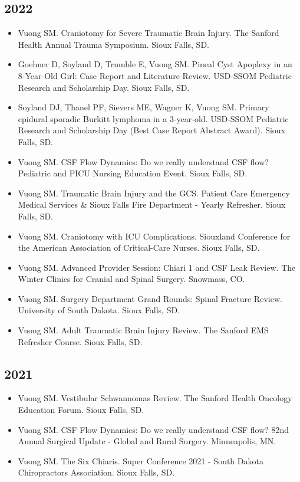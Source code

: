 \documentclass[11pt, a4paper]{article}
\begin{document}
\subsection{2022}
\begin{itemize}
  \setlength\itemindent{0.25em}
  \item Vuong SM. Craniotomy for Severe Traumatic Brain Injury. The Sanford Health Annual Trauma Symposium. Sioux Falls, SD.
  \item Goehner D, Soyland D, Trumble E, Vuong SM. Pineal Cyst Apoplexy in an 8-Year-Old Girl: Case Report and Literature Review. USD-SSOM Pediatric Research and Scholarship Day. Sioux Falls, SD.
  \item Soyland DJ, Thanel PF, Sievers ME, Wagner K, Vuong SM. Primary epidural sporadic Burkitt lymphoma in a 3-year-old. USD-SSOM Pediatric Research and Scholarship Day (Best Case Report Abstract Award). Sioux Falls, SD.
  \item Vuong SM. CSF Flow Dynamics: Do we really understand CSF flow? Pediatric and PICU Nursing Education Event. Sioux Falls, SD.
  \item Vuong SM. Traumatic Brain Injury and the GCS. Patient Care Emergency Medical Services \& Sioux Falls Fire Department - Yearly Refresher. Sioux Falls, SD.
  \item Vuong SM. Craniotomy with ICU Complications. Siouxland Conference for the American Association of Critical-Care Nurses. Sioux Falls, SD.
  \item Vuong SM. Advanced Provider Session: Chiari 1 and CSF Leak Review. The Winter Clinics for Cranial and Spinal Surgery. Snowmass, CO.
  \item Vuong SM. Surgery Department Grand Rounds: Spinal Fracture Review. University of South Dakota. Sioux Falls, SD.
  \item Vuong SM. Adult Traumatic Brain Injury Review. The Sanford EMS Refresher Course. Sioux Falls, SD.
\end{itemize}

\subsection{2021}
\begin{itemize}
  \setlength\itemindent{0.25em}
  \item Vuong SM. Vestibular Schwannomas Review. The Sanford Health Oncology Education Forum. Sioux Falls, SD.
  \item Vuong SM. CSF Flow Dynamics: Do we really understand CSF flow? 82nd Annual Surgical Update - Global and Rural Surgery. Minneapolis, MN.
  \item Vuong SM. The Six Chiaris. Super Conference 2021 - South Dakota Chiropractors Association. Sioux Falls, SD.
\end{itemize}
\end{document}
